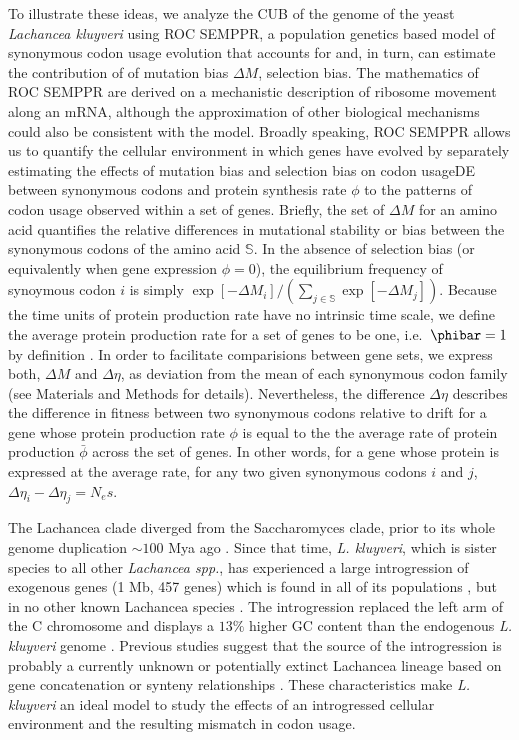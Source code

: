 \documentclass[doublespacing,linenumbers]{bmcart-modified}
\newcommand{\kluyveri}{\textit{L. kluyveri}\xspace}
\newcommand{\ROC}{ROC SEMPPR\xspace}
\newcommand{\GC}{GC content\xspace}
\newcommand{\DM}{\ensuremath{{\Delta M}}\xspace}
\newcommand{\DE}{\ensuremath{{\Delta \eta}}\xspace}
\newcommand{\Ne}{\ensuremath{N_e}\xspace}
\newcommand{\setS}{\ensuremath{\mathbb{S}}\xspace}
\newcommand{\barphi}{\ensuremath{\bar{\phi}}\xspace}
\begin{document}
To illustrate these ideas, we analyze the CUB of the genome of the yeast \emph{Lachancea kluyveri} using \ROC, a population genetics based model of synonymous codon usage evolution that accounts for and, in turn, can estimate the contribution of of mutation bias \DM, selection bias.
The mathematics of \ROC are derived on a mechanistic description of ribosome movement along an mRNA, although the approximation of other biological mechanisms could also be consistent with the model.
Broadly speaking, \ROC allows us to quantify the cellular environment in which genes have evolved by separately estimating the effects of mutation bias and selection bias on codon usageDE between synonymous codons and protein synthesis rate $\phi$ to the patterns of codon usage observed within a set of genes.
Briefly, the set of \DM for an amino acid quantifies the relative differences in mutational stability or bias between the synonymous codons of the amino acid \setS.
In the absence of selection bias (or equivalently when gene expression $\phi = 0$), the equilibrium frequency of synoymous codon $i$ is simply $\exp[-\DM_i]/\left(\sum_{j \in \setS}\exp[-\DM_j]\right)$.
Because the time units of protein production rate have no intrinsic time scale, we define the average protein production rate for a set of genes to be one, i.e.~$\phibar = 1$ by definition \citep{gilchrist2015}. 
In order to facilitate comparisions between gene sets, we express both, \DM and \DE, as deviation from the mean of each synonymous codon family (see Materials and Methods for details).
Nevertheless, the difference \DE describes the difference in fitness between two synonymous codons relative to drift for a gene whose protein production rate $\phi$ is equal to the the average rate of protein production $\barphi$ across the set of genes.
In other words, for a gene whose protein is expressed at the average rate, for any two given synonymous codons $i$ and $j$,  $\DE_i-\DE_j = \Ne s$.

The Lachancea clade diverged from the Saccharomyces clade, prior to its whole genome duplication $\sim 100$ Mya ago \citep{MHM2015,Beimforde2014}. %
Since that time, \kluyveri, which is sister species to all other \emph{Lachancea spp.},  has experienced a large introgression of exogenous genes (1 Mb, 457 genes) which is found in all of its populations \citep{payen2009,friedrich2015}, but in no other known Lachancea species \citep{vakirlis2016}.
The introgression replaced the left arm of the C chromosome and displays a $13 \%$ higher \GC than the endogenous \kluyveri genome \citep{payen2009, friedrich2015}.
Previous studies suggest that the source of the introgression is probably a currently unknown or potentially extinct Lachancea lineage based on gene concatenation or synteny relationships \citep{payen2009, friedrich2015, vakirlis2016, brion2017}.
These characteristics make \kluyveri an ideal model to study the effects of an introgressed cellular environment and the resulting mismatch in codon usage.
\end{document}
